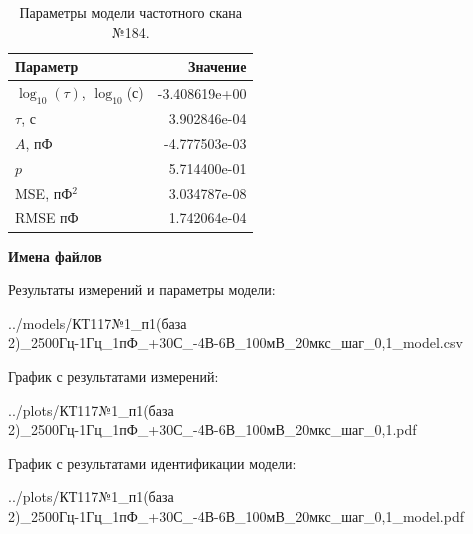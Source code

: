 \begin{table}[!ht]
    \centering
    \caption{Параметры модели частотного скана №184.}
    \begin{tabular}{|l|r|}
        \hline
        Параметр                                       & Значение                  \\ \hline
        $\log_{10}(\tau)$, $\log_{10}$(с)              & -3.408619e+00             \\ \hline
        $\tau$, с                                      & 3.902846e-04              \\ \hline
        $A$, пФ                                        & -4.777503e-03             \\ \hline
        $p$                                            & 5.714400e-01              \\ \hline
        MSE, пФ$^2$                                    & 3.034787e-08              \\ \hline
        RMSE пФ                                        & 1.742064e-04              \\ \hline
    \end{tabular}
    \label{table:frequency_scan_model_184}
\end{table}

\textbf{Имена файлов}

Результаты измерений и параметры модели:

\scriptsize../models/КТ117№1\_п1(база 2)\_2500Гц-1Гц\_1пФ\_+30С\_-4В-6В\_100мВ\_20мкс\_шаг\_0,1\_model.csv
\normalsize

График с результатами измерений:

\scriptsize../plots/КТ117№1\_п1(база 2)\_2500Гц-1Гц\_1пФ\_+30С\_-4В-6В\_100мВ\_20мкс\_шаг\_0,1.pdf
\normalsize

График с результатами идентификации модели:

\scriptsize../plots/КТ117№1\_п1(база 2)\_2500Гц-1Гц\_1пФ\_+30С\_-4В-6В\_100мВ\_20мкс\_шаг\_0,1\_model.pdf
\normalsize

